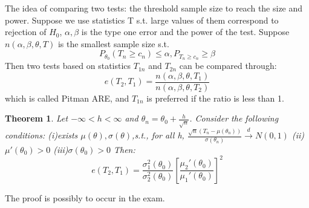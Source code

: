 \documentclass{ctexart}
\newtheorem{theorem}{Theorem}[subsection]
\begin{document}
The idea of comparing two tests: the threshold sample size to reach the size and power. 
Suppose we use statistics T s.t. large values of them correspond to rejection of \(H_{0}\), \(\alpha,\beta\) is the type one error and the power of the test. Suppose \(n(\alpha,\beta,\theta,T)\) is the smallest sample size s.t.
\[
P_{\theta_{0}}(T_{n}\ge c_{n})\le \alpha,P_{T_{n}\ge c_{n}}\ge \beta
\]   
Then two tests based on statistics \(T_{1n}\) and \(T_{2n}\) can be compared through: 
\[
e(T_{2},T_{1})=\frac{n(\alpha,\beta,\theta,T_{1})}{n(\alpha,\beta,\theta,T_{2})}
\]   
which is called Pitman ARE, and \(T_{1n}\) is preferred if the ratio is less than 1. 
\begin{theorem}
  Let \(-\infty<h<\infty\) and \(\theta_{n}=\theta_{0}+\frac{h}{\sqrt{n}}\). Consider the following conditions: (i)exists \(\mu(\theta),\sigma(\theta)\),s.t., for all h, \(\frac{\sqrt{n}(T_{n}-\mu(\theta_{n}))}{\sigma(\theta_{n})}\xrightarrow{d}N(0,1)\)  (ii)\(\mu'(\theta_{0})>0\) (iii)\(\sigma(\theta_{0})>0\) 
  Then: 
  \[
  e(T_{2},T_{1})=\frac{\sigma_{1}^{2}(\theta_{0})}{\sigma_{2}^{2}(\theta_{0})}[\frac{\mu_{2}'(\theta_{0})}{\mu_{1}'(\theta_{0})}]^{2}
  \]   
\end{theorem} 
The proof is possibly to occur in the exam. 
\end{document}
